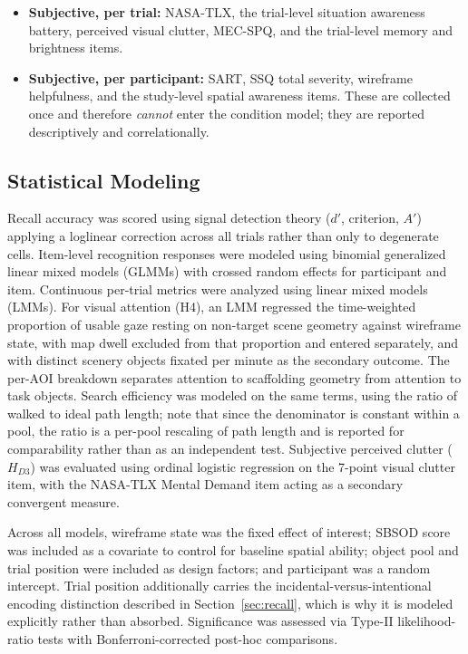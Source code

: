 \begin{itemize}
    $A'$ from the 30-item recall test, under both the strict and lenient
    response policies.
  \item \textbf{Subjective, per trial:} NASA-TLX, the trial-level situation
    awareness battery, perceived visual clutter, MEC-SPQ, and the trial-level
    memory and brightness items.
  \item \textbf{Subjective, per participant:} SART, SSQ total severity,
    wireframe helpfulness, and the study-level spatial awareness items. These
    are collected once and therefore \emph{cannot} enter the condition model;
    they are reported descriptively and correlationally.
\end{itemize}

\subsection{Statistical Modeling}

Recall accuracy was scored using signal detection theory ($d'$, criterion,
$A'$) applying a loglinear correction across all trials rather than only to
degenerate cells. Item-level recognition responses were modeled using binomial
generalized linear mixed models (GLMMs) with crossed random effects for
participant and item. Continuous per-trial metrics were analyzed using linear
mixed models (LMMs). For visual attention (H4), an LMM regressed the
time-weighted proportion of usable gaze resting on non-target scene geometry
against wireframe state, with map dwell excluded from that proportion and
entered separately, and with distinct scenery objects fixated per minute as
the secondary outcome. The per-AOI breakdown separates attention to
scaffolding geometry from attention to task objects. Search efficiency was
modeled on the same terms, using the ratio of walked to ideal path length;
note that since the denominator is constant within a pool, the ratio is a
per-pool rescaling of path length and is reported for comparability rather
than as an independent test. Subjective perceived clutter ($H_{D3}$) was
evaluated using ordinal logistic regression on the 7-point visual clutter
item, with the NASA-TLX Mental Demand item acting as a secondary convergent
measure.

Across all models, wireframe state was the fixed effect of interest; SBSOD
score was included as a covariate to control for baseline spatial ability;
object pool and trial position were included as design factors; and
participant was a random intercept. Trial position additionally carries the
incidental-versus-intentional encoding distinction described in
Section~\ref{sec:recall}, which is why it is modeled explicitly rather than
absorbed. Significance was assessed via Type-II likelihood-ratio tests with
Bonferroni-corrected post-hoc comparisons.
